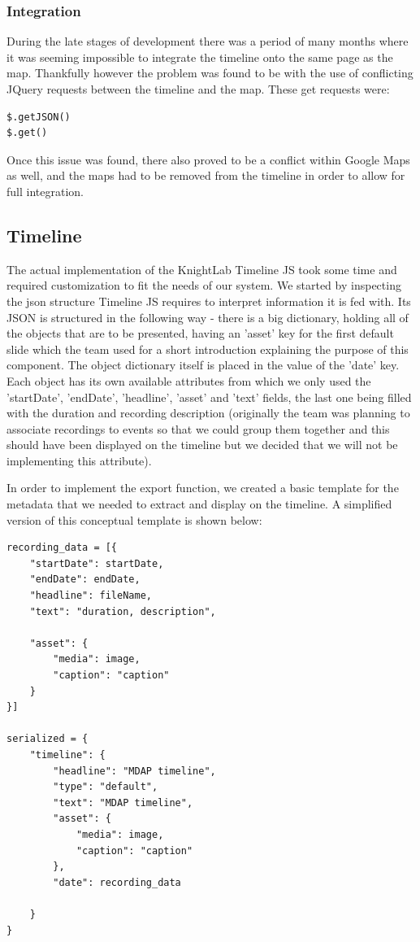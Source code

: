 \documentclass{l3proj}
\begin{document}
\subsubsection{Integration}

During the late stages of development there was a period of many months where it was seeming impossible to integrate the timeline onto the same page as the map. Thankfully however the problem was found to be with the use of conflicting JQuery requests between the timeline and the map. These get requests were:
\begin{verbatim}
$.getJSON()
$.get()
\end{verbatim}
Once this issue was found, there also proved to be a conflict within Google Maps as well, and the maps had to be removed from the timeline in order to allow for full integration.

\subsection{Timeline}

The actual implementation of the KnightLab Timeline JS took some time and required customization to fit the needs of our system. We started by inspecting the json structure Timeline JS requires to interpret information it is fed with.
Its JSON is structured in the following way - there is a big dictionary, holding all of the objects that are to be presented, having an 'asset' key for the first default slide which the team used for a short introduction explaining the purpose of this component.
The object dictionary itself is placed in the value of the 'date' key. Each object has its own available attributes from which we only used the 'startDate', 'endDate', 'headline', 'asset' and 'text' fields, the last one being filled with the duration and recording description (originally the team was planning to associate recordings to events so that we could group them together and this should have been displayed on the timeline but we decided that we will not be implementing this attribute).


In order to implement the export function, we created a basic template for the metadata that we needed to extract and display on the timeline. A simplified version of this conceptual template is shown below:


\begin{verbatim}
recording_data = [{
	"startDate": startDate,
	"endDate": endDate,
	"headline": fileName,
	"text": "duration, description",

	"asset": {
		"media": image,
		"caption": "caption"
	}
}]

serialized = {
	"timeline": {
		"headline": "MDAP timeline",
		"type": "default",
		"text": "MDAP timeline",
		"asset": {
			"media": image,
			"caption": "caption"
		},
		"date": recording_data

	}
}
\end{verbatim}
\end{document}

